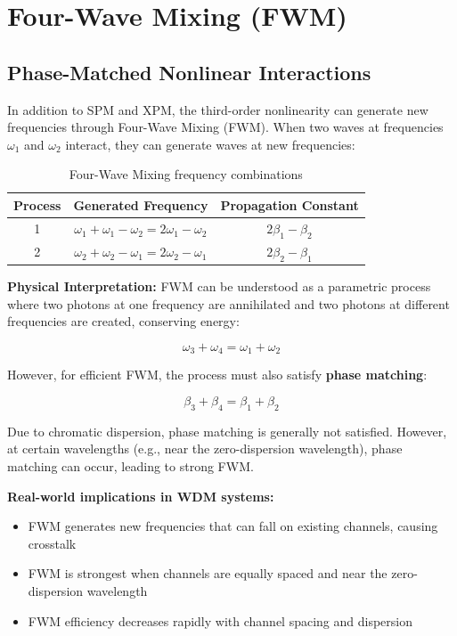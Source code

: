 \documentclass[a4paper, 11pt]{article}
\begin{document}
\section{Four-Wave Mixing (FWM)}

\subsection{Phase-Matched Nonlinear Interactions}

In addition to SPM and XPM, the third-order nonlinearity can generate new frequencies through Four-Wave Mixing (FWM). When two waves at frequencies $\omega_1$ and $\omega_2$ interact, they can generate waves at new frequencies:

\begin{table}[H]
    \centering
    \caption{Four-Wave Mixing frequency combinations}
    \label{tab:fwm_frequencies}
    \begin{tabular}{ccc}
        \toprule
        \textbf{Process} & \textbf{Generated Frequency} & \textbf{Propagation Constant} \\
        \midrule
        1 & $\omega_1 + \omega_1 - \omega_2 = 2\omega_1 - \omega_2$ & $2\beta_1 - \beta_2$ \\
        2 & $\omega_2 + \omega_2 - \omega_1 = 2\omega_2 - \omega_1$ & $2\beta_2 - \beta_1$ \\
        \bottomrule
    \end{tabular}
\end{table}

\begin{physical}
\textbf{Physical Interpretation:} FWM can be understood as a parametric process where two photons at one frequency are annihilated and two photons at different frequencies are created, conserving energy:

\begin{equation}
    \omega_3 + \omega_4 = \omega_1 + \omega_2
\end{equation}

However, for efficient FWM, the process must also satisfy \textbf{phase matching}:

\begin{equation}
    \beta_3 + \beta_4 = \beta_1 + \beta_2
\end{equation}

Due to chromatic dispersion, phase matching is generally not satisfied. However, at certain wavelengths (e.g., near the zero-dispersion wavelength), phase matching can occur, leading to strong FWM.

\textbf{Real-world implications in WDM systems:}
\begin{itemize}
    \item FWM generates new frequencies that can fall on existing channels, causing crosstalk
    \item FWM is strongest when channels are equally spaced and near the zero-dispersion wavelength
    \item FWM efficiency decreases rapidly with channel spacing and dispersion
\end{itemize}
\end{physical}
\end{document}
